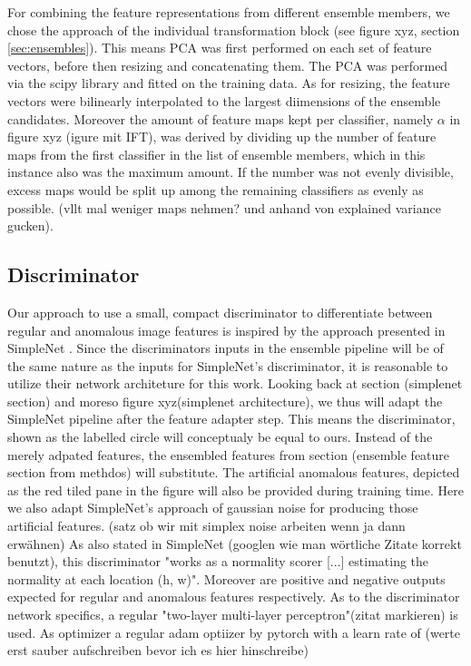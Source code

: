 For combining the feature representations from different ensemble members, we chose the approach of the individual transformation block (see figure xyz, section \ref{sec:ensembles}). This means 
PCA was first performed on each set of feature vectors, before then resizing and concatenating them. The PCA was performed via the scipy library and fitted on the training data. As for resizing, 
the feature vectors were bilinearly interpolated to the largest diimensions of the ensemble candidates. Moreover the amount of feature maps kept per classifier, namely $\alpha$ in figure xyz 
(igure mit IFT), was derived by dividing up the number of feature maps from the first classifier in the list of ensemble members, which in this instance also was the maximum amount. If the number 
was not evenly divisible, excess maps would be split up among the remaining classifiers as evenly as possible. (vllt mal weniger maps nehmen? und anhand von explained variance gucken).



\subsection{Discriminator}
\label{sec:discriminator}
Our approach to use a small, compact discriminator to differentiate between regular and anomalous image features is inspired by the approach 
presented in SimpleNet \cite{liu2023simplenet}. Since the discriminators inputs in the ensemble pipeline will be of the same nature as 
the inputs for SimpleNet's discriminator, it is reasonable to utilize their network architeture for this work. Looking back at section 
(simplenet section) and moreso figure xyz(simplenet architecture), we thus will adapt the SimpleNet pipeline after the feature adapter step. 
This means the discriminator, shown as the labelled circle will conceptualy be equal to ours. Instead of the merely adpated features, 
the ensembled features from section (ensemble feature section from methdos) will substitute. The artificial anomalous features, 
depicted as the red tiled pane in the figure will also be provided during training time. Here we also adapt SimpleNet's approach of 
gaussian noise for producing those artificial features. (satz ob wir mit simplex noise arbeiten wenn ja dann erwähnen) As also stated in 
SimpleNet (googlen wie man wörtliche Zitate korrekt benutzt), this discriminator "works as a normality scorer [...] estimating the normality 
at each location (h, w)". Moreover are positive and negative outputs expected for regular and anomalous features respectively.
As to the discriminator network specifics, a regular "two-layer multi-layer perceptron"(zitat markieren) is used. As optimizer a regular 
adam optiizer by pytorch with a learn rate of (werte erst sauber aufschreiben bevor ich es hier hinschreibe)



